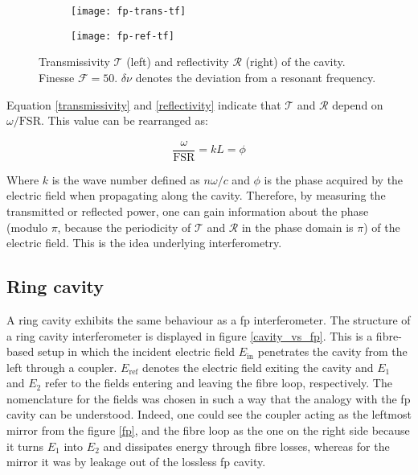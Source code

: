 \begin{figure}[h]
	\centering
	\begin{subfigure}{.5\textwidth}
		\centering
		\texttt{[image: fp-trans-tf]}
	\end{subfigure}%
	\begin{subfigure}{.5\textwidth}
		\centering
		\texttt{[image: fp-ref-tf]}
	\end{subfigure}
	\caption{Transmissivity $\mathcal{T}$ (left) and reflectivity $\mathcal{R}$ (right) of the cavity. Finesse $\mathcal{F}=50$. $\delta \nu$ denotes the deviation from a resonant frequency.}
	\label{fp-tf}
\end{figure}

Equation \eqref{transmissivity} and \eqref{reflectivity} indicate that $\mathcal{T}$ and $\mathcal{R}$ depend on $\omega/\text{FSR}$. This value can be rearranged as:

\begin{equation}
	\frac{\omega}{\text{FSR}} = kL = \phi
\end{equation}

Where $k$ is the wave number defined as $n \omega/c$ and $\phi$ is the phase acquired by the electric field when propagating along the cavity. Therefore, by measuring the transmitted or reflected power, one can gain information about the phase (modulo $\pi$, because the periodicity of $\mathcal{T}$ and $\mathcal{R}$ in the phase domain is $\pi$) of the electric field. This is the idea underlying interferometry.


\subsection{Ring cavity}

\label{subsec-ring-cavity}

A ring cavity exhibits the same behaviour as a \gls{fp} interferometer. The structure of a ring cavity interferometer is displayed in figure \ref{cavity_vs_fp}. This is a fibre-based setup in which the incident electric field $E_{\text{in}}$ penetrates the cavity from the left through a coupler. $E_{\text{ref}}$ denotes the electric field exiting the cavity and $E_1$ and $E_2$ refer to the fields entering and leaving the fibre loop, respectively. The nomenclature for the fields was chosen in such a way that the analogy with the \gls{fp} cavity can be understood. Indeed, one could see the coupler acting as the leftmost mirror from the figure \ref{fp}, and the fibre loop as the one on the right side because it turns $E_1$ into $E_2$ and dissipates energy through fibre losses, whereas for the mirror it was by leakage out of the lossless \gls{fp} cavity.

